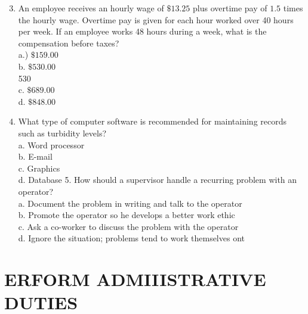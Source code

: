 \documentclass[10pt]{article}
\begin{document}
\begin{enumerate}
  \setcounter{enumi}{2}
  \item An employee receives an hourly wage of $\$ 13.25$ plus overtime pay of $1.5$ times the hourly wage. Overtime pay is given for each hour worked over 40 hours per week. If an employee works 48 hours during a week, what is the compensation before taxes?\\
a.) $\$ 159.00$\\
b. $\$ 530.00$\\
530\\
c. $\$ 689.00$\\
d. $\$ 848.00$

  \item What type of computer software is recommended for maintaining records such as turbidity levels?\\
a. Word processor\\
b. E-mail\\
c. Graphics\\
d. Database 5. How should a supervisor handle a recurring problem with an operator?\\
a. Document the problem in writing and talk to the operator\\
b. Promote the operator so he develops a better work ethic\\
c. Ask a co-worker to discuss the problem with the operator\\
d. Ignore the situation; problems tend to work themselves ont

\end{enumerate}

\section{ERFORM ADMIIISTRATIVE DUTIES}
\end{document}
